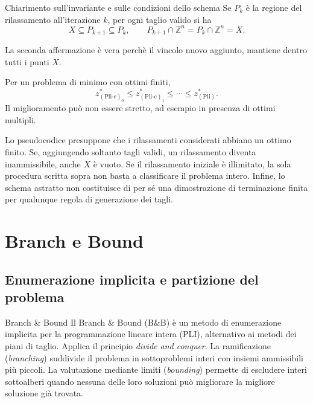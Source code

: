 \begin{remark}{Chiarimento sull'invariante e sulle condizioni dello schema}
Se \(P_k\) è la regione del rilassamento all'iterazione \(k\),
per ogni taglio valido si ha
\[
X\subseteq P_{k+1}\subseteq P_k,
\qquad
P_{k+1}\cap\mathbb Z^n=P_k\cap\mathbb Z^n=X.
\]

La seconda affermazione è vera perchè il vincolo nuovo aggiunto, mantiene dentro tutti i punti $X$. 

Per un problema di minimo con ottimi finiti,
\[
z^*_{(\mathrm{Pli\text{-}c})_0}
\leq z^*_{(\mathrm{Pli\text{-}c})_1}
\leq \cdots \leq z^*_{(\mathrm{Pli})}.
\]
Il miglioramento può non essere stretto, ad esempio in presenza
di ottimi multipli.

Lo pseudocodice presuppone che i rilassamenti considerati
abbiano un ottimo finito. Se, aggiungendo soltanto tagli validi,
un rilassamento diventa inammissibile, anche \(X\) è vuoto.
Se il rilassamento iniziale è illimitato, la sola procedura
scritta sopra non basta a classificare il problema intero.
Infine, lo schema astratto non costituisce di per sé
una dimostrazione di terminazione finita per qualunque
regola di generazione dei tagli.
\end{remark}

\newpage

\section{Branch e Bound}
\begingroup
\newcommand{\BBpli}[1]{\mathrm{PLI}_{#1}}
\newcommand{\BBrel}[1]{\mathrm{PLI}_{#1}\text{-c}}
\newcommand{\BBinc}{z_{\mathrm{opt}}}
\newcommand{\BBsol}{x_{\mathrm{opt}}}
\newcommand{\BBfig}[2]{%
  \par\nobreak\smallskip\nobreak
  {\small\textit{Figura #1 delle dispense.} #2\par}}

\subsection{Enumerazione implicita e partizione del problema}

\begin{definition}{Branch \& Bound}
Il Branch \& Bound (B\&B) è un metodo di enumerazione implicita per la
programmazione lineare intera (PLI), alternativo ai metodi dei piani di
taglio. Applica il principio \emph{divide and conquer}. La ramificazione
(\emph{branching}) suddivide il problema in sottoproblemi interi con
insiemi ammissibili più piccoli. La valutazione mediante limiti
(\emph{bounding}) permette di escludere interi sottoalberi quando nessuna
delle loro soluzioni può migliorare la migliore soluzione già trovata.
\end{definition}

